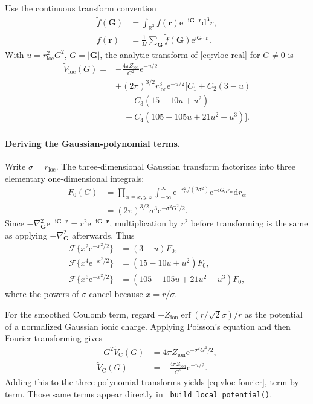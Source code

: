 \documentclass[10pt,twocolumn]{article}
\newcommand{\ii}{\mathrm{i}}
\newcommand{\e}{\mathrm{e}}
\newcommand{\dd}{\mathrm{d}}
\newcommand{\zion}{Z_{\mathrm{ion}}}
\newcommand{\gvec}{\mathbf G}
\newcommand{\rvec}{\mathbf r}
\newcommand{\code}[1]{\texttt{#1}}
\DeclareMathOperator{\erf}{erf}
\begin{document}
Use the continuous transform convention
\begin{align}
\widetilde f(\gvec)
&=\int_{\mathbb R^3}f(\rvec)\e^{-\ii\gvec\cdot\rvec}\dd^3r,\\
f(\rvec)
&=\frac{1}{\Omega}\sum_{\gvec}
\widetilde f(\gvec)\e^{\ii\gvec\cdot\rvec}.
\label{eq:fourier-convention}
\end{align}
With \(u=r_{\mathrm{loc}}^2G^2\), \(G=|\gvec|\), the analytic transform of
\cref{eq:vloc-real} for \(G\ne0\) is
\begin{align}
\widetilde V_{\mathrm{loc}}(G)
={}&-\frac{4\pi\zion}{G^2}\e^{-u/2}
\nonumber\\
&+(2\pi)^{3/2}r_{\mathrm{loc}}^3\e^{-u/2}
\Big[
C_1+C_2(3-u)
\nonumber\\
&\quad+C_3(15-10u+u^2)
\nonumber\\
&\quad+C_4(105-105u+21u^2-u^3)
\Big].
\label{eq:vloc-fourier}
\end{align}

\paragraph{Deriving the Gaussian-polynomial terms.}
Write \(\sigma=r_{\mathrm{loc}}\).  The three-dimensional Gaussian transform
factorizes into three elementary one-dimensional integrals:
\begin{align}
F_0(G)
&=\prod_{\alpha=x,y,z}
\int_{-\infty}^{\infty}
\e^{-r_\alpha^2/(2\sigma^2)}
\e^{-\ii G_\alpha r_\alpha}\dd r_\alpha\nonumber\\
&=(2\pi)^{3/2}\sigma^3\e^{-\sigma^2G^2/2}.
\end{align}
Since
\(-\nabla_{\gvec}^2\e^{-\ii\gvec\cdot\rvec}
=r^2\e^{-\ii\gvec\cdot\rvec}\), multiplication by \(r^2\) before
transforming is the same as applying \(-\nabla_\gvec^2\) afterwards.  Thus
\begin{align}
\mathcal F\{x^2\e^{-x^2/2}\}
&=(3-u)F_0,\nonumber\\
\mathcal F\{x^4\e^{-x^2/2}\}
&=(15-10u+u^2)F_0,\nonumber\\
\mathcal F\{x^6\e^{-x^2/2}\}
&=(105-105u+21u^2-u^3)F_0,
\end{align}
where the powers of \(\sigma\) cancel because \(x=r/\sigma\).

For the smoothed Coulomb term, regard
\(-\zion\erf(r/\sqrt2\sigma)/r\) as the potential of a normalized Gaussian
ionic charge.  Applying Poisson's equation and then Fourier transforming gives
\begin{align}
-G^2\widetilde V_{\mathrm C}(G)
&=4\pi\zion\e^{-\sigma^2G^2/2},\nonumber\\
\widetilde V_{\mathrm C}(G)
&=-\frac{4\pi\zion}{G^2}\e^{-u/2}.
\end{align}
Adding this to the three polynomial transforms yields
\cref{eq:vloc-fourier}, term by term.  Those same terms appear directly in
\code{\_build\_local\_potential()}.
\end{document}
